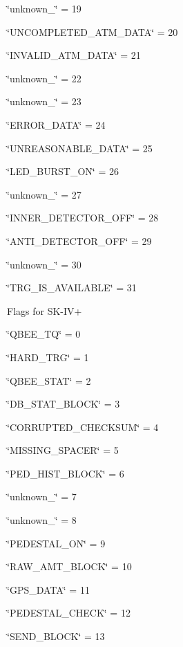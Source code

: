 \begin{DoxyItemize}
\item \char`\"{}unknown\+\_\char`\"{} = 19
\item \char`\"{}\+UNCOMPLETED\+\_\+\+ATM\+\_\+\+DATA\char`\"{} = 20
\item \char`\"{}\+INVALID\+\_\+\+ATM\+\_\+\+DATA\char`\"{} = 21
\item \char`\"{}unknown\+\_\char`\"{} = 22
\item \char`\"{}unknown\+\_\char`\"{} = 23
\item \char`\"{}\+ERROR\+\_\+\+DATA\char`\"{} = 24
\item \char`\"{}\+UNREASONABLE\+\_\+\+DATA\char`\"{} = 25
\item \char`\"{}\+LED\+\_\+\+BURST\+\_\+\+ON\char`\"{} = 26
\item \char`\"{}unknown\+\_\char`\"{} = 27
\item \char`\"{}\+INNER\+\_\+\+DETECTOR\+\_\+\+OFF\char`\"{} = 28
\item \char`\"{}\+ANTI\+\_\+\+DETECTOR\+\_\+\+OFF\char`\"{} = 29
\item \char`\"{}unknown\+\_\char`\"{} = 30
\item \char`\"{}\+TRG\+\_\+\+IS\+\_\+\+AVAILABLE\char`\"{} = 31
\item Flags for SK-\/\+IV+
\item \char`\"{}\+QBEE\+\_\+\+TQ\char`\"{} = 0
\item \char`\"{}\+HARD\+\_\+\+TRG\char`\"{} = 1
\item \char`\"{}\+QBEE\+\_\+\+STAT\char`\"{} = 2
\item \char`\"{}\+DB\+\_\+\+STAT\+\_\+\+BLOCK\char`\"{} = 3
\item \char`\"{}\+CORRUPTED\+\_\+\+CHECKSUM\char`\"{} = 4
\item \char`\"{}\+MISSING\+\_\+\+SPACER\char`\"{} = 5
\item \char`\"{}\+PED\+\_\+\+HIST\+\_\+\+BLOCK\char`\"{} = 6
\item \char`\"{}unknown\+\_\char`\"{} = 7
\item \char`\"{}unknown\+\_\char`\"{} = 8
\item \char`\"{}\+PEDESTAL\+\_\+\+ON\char`\"{} = 9
\item \char`\"{}\+RAW\+\_\+\+AMT\+\_\+\+BLOCK\char`\"{} = 10
\item \char`\"{}\+GPS\+\_\+\+DATA\char`\"{} = 11
\item \char`\"{}\+PEDESTAL\+\_\+\+CHECK\char`\"{} = 12
\item \char`\"{}\+SEND\+\_\+\+BLOCK\char`\"{} = 13

\end{DoxyItemize}
